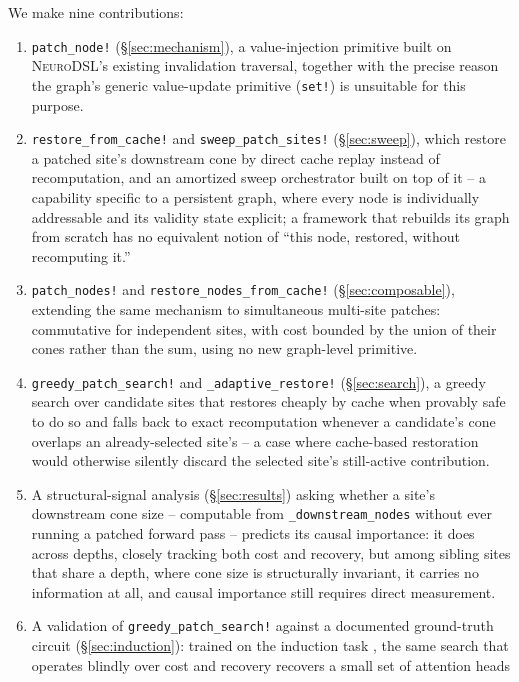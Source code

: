 \documentclass{article}
\begin{document}
We make nine contributions:
\begin{enumerate}
    \item \texttt{patch\_node!} (\S\ref{sec:mechanism}), a value-injection primitive built on
    \textsc{NeuroDSL}'s existing invalidation traversal, together with the precise reason the
    graph's generic value-update primitive (\texttt{set!}) is unsuitable for this purpose.
    \item \texttt{restore\_from\_cache!} and \texttt{sweep\_patch\_sites!}
    (\S\ref{sec:sweep}), which restore a patched site's downstream cone by direct cache replay
    instead of recomputation, and an amortized sweep orchestrator built on top of it -- a
    capability specific to a persistent graph, where every node is individually addressable and
    its validity state explicit; a framework that rebuilds its graph from scratch has no
    equivalent notion of ``this node, restored, without recomputing it.''
    \item \texttt{patch\_nodes!} and \texttt{restore\_nodes\_from\_cache!} (\S\ref{sec:composable}),
    extending the same mechanism to simultaneous multi-site patches: commutative for independent
    sites, with cost bounded by the union of their cones rather than the sum, using no new
    graph-level primitive.
    \item \texttt{greedy\_patch\_search!} and \texttt{\_adaptive\_restore!} (\S\ref{sec:search}), a
    greedy search over candidate sites that restores cheaply by cache when provably safe to do so
    and falls back to exact recomputation whenever a candidate's cone overlaps an
    already-selected site's -- a case where cache-based restoration would otherwise silently
    discard the selected site's still-active contribution.
    \item A structural-signal analysis (\S\ref{sec:results}) asking whether a site's downstream
    cone size -- computable from \texttt{\_downstream\_nodes} without ever running a patched
    forward pass -- predicts its causal importance: it does across depths, closely tracking both
    cost and recovery, but among sibling sites that share a depth, where cone size is structurally
    invariant, it carries no information at all, and causal importance still requires direct
    measurement.
    \item A validation of \texttt{greedy\_patch\_search!} against a documented ground-truth
    circuit (\S\ref{sec:induction}): trained on the induction task \cite{induction}, the same
    search that operates blindly over cost and recovery recovers a small set of attention heads

\end{enumerate}
\end{document}
